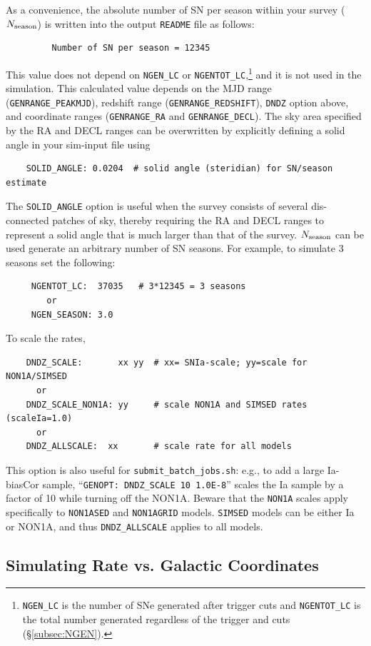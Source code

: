 \documentclass[12pt]{article}
\newcommand{\Nseason}{N_{\rm season}}
\newcommand{\submit}{\tt submit\_batch\_jobs.sh}
\begin{document}
As a convenience, the absolute number of SN per season within your survey
($\Nseason$) is written into the output {\tt README} file as follows:
%
\begin{verbatim}
         Number of SN per season = 12345
\end{verbatim}
%
This value does not depend on 
{\tt NGEN\_LC} or {\tt NGENTOT\_LC},\footnote{
{\tt NGEN\_LC} is the number of SNe generated after trigger cuts and
{\tt NGENTOT\_LC} is the total number generated regardless of the
trigger and cuts (\S\ref{subsec:NGEN}).
} %
and it is not used in the simulation.
This calculated value depends on the
MJD range ({\tt GENRANGE\_PEAKMJD}),
redshift range ({\tt GENRANGE\_REDSHIFT}),
{\tt DNDZ} option above,
and coordinate ranges ({\tt GENRANGE\_RA} and {\tt GENRANGE\_DECL}).
The sky area specified by the RA and DECL ranges can be overwritten
by explicitly defining a solid angle in your sim-input file using
\begin{verbatim}
    SOLID_ANGLE: 0.0204  # solid angle (steridian) for SN/season estimate
\end{verbatim}
The {\tt SOLID\_ANGLE} option is useful when the survey consists
of several dis-connected patches of sky, thereby requiring the
RA and DECL ranges to represent a solid  angle that is much larger
than that of the survey.
%
$\Nseason$ can be used generate an arbitrary number of SN seasons. 
For example, to simulate 3 seasons set the following:
\begin{verbatim}
     NGENTOT_LC:  37035   # 3*12345 = 3 seasons
        or
     NGEN_SEASON: 3.0
\end{verbatim}

\bigskip
To scale the rates,
\begin{verbatim}
    DNDZ_SCALE:       xx yy  # xx= SNIa-scale; yy=scale for NON1A/SIMSED
      or
    DNDZ_SCALE_NON1A: yy     # scale NON1A and SIMSED rates (scaleIa=1.0)
      or
    DNDZ_ALLSCALE:  xx       # scale rate for all models
\end{verbatim}
This option is also useful for {\submit}:
e.g., to add a large Ia-biasCor sample, 
``{\tt GENOPT:  DNDZ\_SCALE 10 1.0E-8}'' scales the
Ia sample by a factor of 10 while turning off the NON1A.
Beware that the {\tt NON1A} scales apply specifically
to {\tt NON1ASED} and {\tt NON1AGRID} models.
{\tt SIMSED} models can be either Ia or NON1A, and thus
{\tt DNDZ\_ALLSCALE} applies to all models.

\clearpage 
\subsection{Simulating Rate vs. Galactic Coordinates}
\label{subsec:DNDB}
\end{document}

